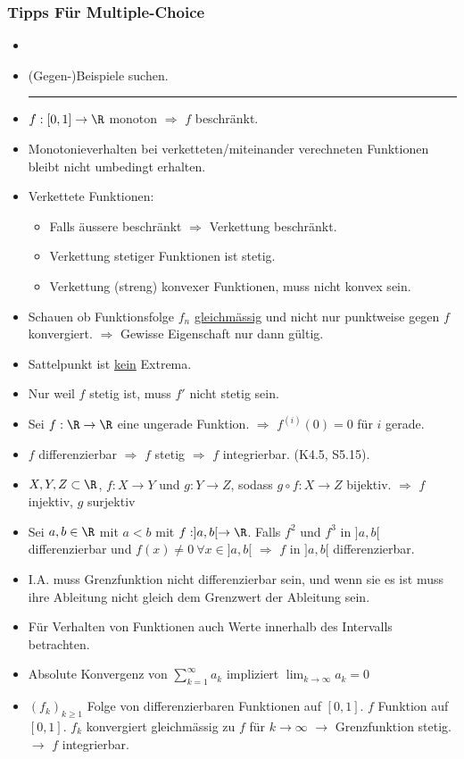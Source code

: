 \subsubsection{Tipps Für Multiple-Choice}%
\label{sub:tipps_fur_multiple_choice}

\begin{itemize}
	\item {}
	\item (Gegen-)Beispiele suchen.
	\hrule
	\item $f: [0,1] \to \R$ monoton $\Longrightarrow$ $f$ beschränkt.
	\item Monotonieverhalten bei verketteten/miteinander verechneten Funktionen bleibt nicht umbedingt erhalten.
	\item Verkettete Funktionen:
		\begin{itemize}
			\item Falls äussere beschränkt $\Rightarrow$ Verkettung beschränkt.
			\item Verkettung stetiger Funktionen ist stetig.
			\item Verkettung (streng) konvexer Funktionen, muss nicht konvex sein.
		\end{itemize}
	\item Schauen ob Funktionsfolge $f_n$ \underline{gleichmässig} und nicht nur punktweise gegen $f$ konvergiert.
		$ \Rightarrow$ Gewisse Eigenschaft nur dann gültig.
	\item Sattelpunkt ist \underline{kein} Extrema.
	\item Nur weil $f$ stetig ist, muss $f'$ nicht stetig sein.
	\item Sei $f : \R \to \R$ eine ungerade Funktion. $\Rightarrow$ $f^{(i)} (0) = 0$ für $i$ gerade.
	\item $f$ differenzierbar $\Longrightarrow$ $f$ stetig $\Longrightarrow$ $f$ integrierbar. (K4.5, S5.15).
	\item $X,Y,Z \subset \R$, $f: X \to Y$ und $g: Y \to Z$, sodass $g \circ f : X \to Z$ bijektiv. 
		$\Rightarrow$ $f$ injektiv, $g$ surjektiv
	\item Sei $a,b \in \R$ mit $a < b$ mit $f: ]a,b[ \to \R$. Falls $f^2$ und $f^3$ in $]a,b[$
		differenzierbar und $f(x) \neq 0~\forall x \in ]a,b[$ $ \Rightarrow$ $f$ in $]a,b[$ differenzierbar.
	\item I.A. muss Grenzfunktion nicht differenzierbar sein, und wenn sie es ist muss ihre Ableitung nicht
		gleich dem Grenzwert der Ableitung sein.
	\item Für Verhalten von Funktionen auch Werte innerhalb des Intervalls betrachten.
	\item Absolute Konvergenz von $\sum^{\infty}_{k=1} a_k$ impliziert $\lim_{k \to \infty} a_k = 0$
	\item $(f_k)_{k \geq 1}$ Folge von differenzierbaren Funktionen auf $[0,1]$. $f$ Funktion auf $[0,1]$. $f_k$
		konvergiert gleichmässig zu $f$ für $k \to \infty$ $\longrightarrow$ Grenzfunktion stetig. $\longrightarrow$ $f$ integrierbar.
\end{itemize}
